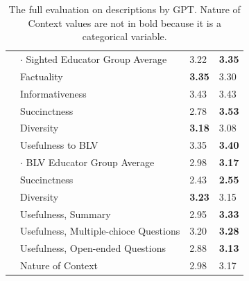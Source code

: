 \begin{table}
\begin{tabular}{llll}
        & $\cdot$ Sighted Educator Group Average        & 3.22 & \textbf{3.35} \\
        & Factuality                                    & \textbf{3.35} & 3.30 \\
        & Informativeness                               & 3.43 & 3.43 \\
        & Succinctness                                  & 2.78 & \textbf{3.53} \\
        & Diversity                                     & \textbf{3.18} & 3.08 \\
        & Usefulness to BLV                             & 3.35 & \textbf{3.40} \\
        
        & $\cdot$ BLV Educator Group Average            & 2.98 & \textbf{3.17} \\
        & Succinctness                                  & 2.43 & \textbf{2.55} \\
        & Diversity                                     & \textbf{3.23} & 3.15 \\
        & Usefulness, Summary                           & 2.95 & \textbf{3.33} \\
        & Usefulness, Multiple-chioce Questions         & 3.20 & \textbf{3.28} \\
        & Usefulness, Open-ended Questions              & 2.88 & \textbf{3.13} \\
        & Nature of Context                             & 2.98 & 3.17 \\

    \bottomrule
    \end{tabular}
\caption{The full evaluation on descriptions by GPT. Nature of Context values are not in bold because it is a categorical variable.}\label{tab:big1a}
\end{table}

